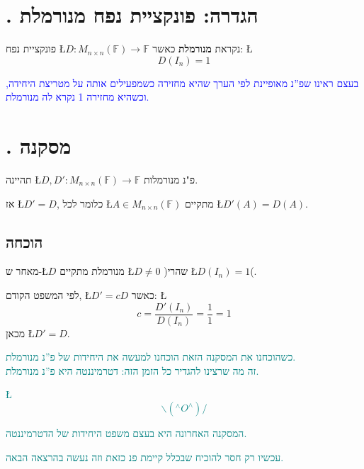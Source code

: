 \documentclass[english,hebrew]{article}
\begin{document}
\section{{\endL}. הגדרה: פונקציית נפח מנורמלת}

פונקציית נפח \L{$D:M_{n\times n}(\mathbb{F})\to\mathbb{F}$} נקראת
\textbf{מנורמלת} כאשר: \L{%
\[
D(I_{n})=1
\]
}%

\medskip{}

\textcolor{blue}{בעצם ראינו שפ\textquotedblright נ מאופיינת לפי הערך
שהיא מחזירה כשמפעילים אותה על מטריצת היחידה, וכשהיא מחזירה 1 נקרא
לה מנורמלת.}

\section{{\endL}. מסקנה}

תהיינה \L{$D,D':M_{n\times n}(\mathbb{F})\to\mathbb{F}$} פ"נ מנורמלות.

אז \L{$D'=D$}, כלומר לכל \L{$A\in M_{n\times n}(\mathbb{F})$} מתקיים
\L{$D'(A)=D(A)$}.

\subsection{הוכחה}

מאחר ש-\L{$D$} מנורמלת מתקיים \L{$D\neq0$} )שהרי \L{$D(I_{n})=1$}(.

לפי המשפט הקודם, \L{$D'=cD$} כאשר: \L{%
\[
c=\frac{D'(I_{n})}{D(I_{n})}=\frac{1}{1}=1
\]
}%
מכאן \L{$D'=D$}.

\medskip{}

\textcolor{teal}{כשהוכחנו את המסקנה הזאת הוכחנו למעשה את היחידות של
פ\textquotedblright נ מנורמלת.}\\

\textcolor{teal}{זה מה שרצינו להגדיר כל הזמן הזה: דטרמיננטה היא פ\textquotedblright נ
מנורמלת. }

\textcolor{teal}{\L{%
\[
\backslash(^{\wedge}O^{\wedge})/
\]
}%
}

\textcolor{teal}{המסקנה האחרונה היא בעצם משפט היחידות של הדטרמיננטה.}

\textcolor{teal}{עכשיו רק חסר להוכיח שבכלל קיימת פ\textquotedbl נ
כזאת וזה נעשה בהרצאה הבאה.}

\newpage{}

\noindent{}
\end{document}
